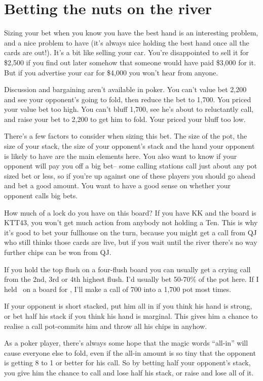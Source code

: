 \section{Betting the nuts on the river}

Sizing your bet when you know you have the best hand is an interesting problem,
and a nice problem to have (it's always nice holding the best hand once all
the cards are out!). It's a bit like selling your car. You're disappointed to
sell it for \$2,500 if you find out later somehow that someone would have paid
\$3,000 for it. But if you advertise your car for \$4,000 you won't hear from
anyone.

Discussion and bargaining aren't available in poker. You can't value
bet 2,200 and see your opponent's going to fold, then reduce
the bet to 1,700. You priced your value bet too high.
You can't bluff 1,700, see he's about to reluctantly call, and raise
your bet to 2,200 to get him to fold. Your priced your bluff too low.

There's a few factors to consider when sizing this bet. The size of the pot, the
size of your stack, the size of your opponent's stack and the hand your
opponent is likely to have are the main elements here. You also want to know
if your opponent will pay you off a big bet-- some calling stations call just
about any pot sized bet or less, so if you're up against one of these players
you should go ahead and bet a good amount. You want to have a good sense
on whether your opponent calls big bets.

How much of a lock do you have on this board? If you have KK and the
board is KTT43, you won't get much action from anybody not holding a Ten.
This is why it's good to bet your fullhouse on the turn, because you might
get a call from QJ who still thinks those cards are live, but if you wait
until the river there's no way further chips can be won from QJ.

If you hold the top flush on a four-flush board you can usually get a crying
call from the 2nd, 3rd or 4th highest flush. I'd usually bet 50-70\% of the
pot here. If I held \Jh\tens\ on a board for \Ah\tenh\nines\fiveh\fourh, I'll
make a call of 700 into a 1,700 pot most times.

If your opponent is short stacked, put him all in if you think his hand is
strong, or bet half his stack if you think his hand is marginal. This
gives him a chance to realise a call pot-commits him and throw all his
chips in anyhow.

As a poker player, there's always some hope that the magic words ``all-in''
will cause everyone else to fold, even if the all-in amount is so tiny
that the opponent is getting 8 to 1 or better for his call. So by betting
half your opponent's stack, you give him the chance to call and lose half
his stack, or raise and lose all of it.

